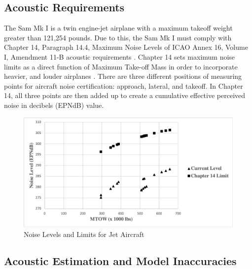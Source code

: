 \subsection{Acoustic Requirements}
The Sam Mk I is a twin engine-jet airplane with a maximum takeoff weight greater than 121,254 pounds. Due to this, the Sam Mk I must comply with Chapter 14, Paragraph 14.4, Maximum Noise Levels of ICAO Annex 16, Volume I, Amendment 11-B acoustic requirements \cite{noise_14}. Chapter 14 sets maximum noise limits as a direct function of Maximum Take-off Mass in order to incorporate heavier, and louder airplanes \cite{noise_14}. There are three different positions of measuring points for aircraft noise certification: approach, lateral, and takeoff. In Chapter 14, all three points are then added up to create a cumulative effective perceived noise in decibels (EPNdB) value.    



\begin{figure}[H]
    \centering
    \includegraphics[width=\linewidth]{Photos/Noise_level.png}
    \caption{Noise Levels and Limits for Jet Aircraft}
    \label{fignoise}
\end{figure}

\subsection{Acoustic Estimation and Model Inaccuracies} 



